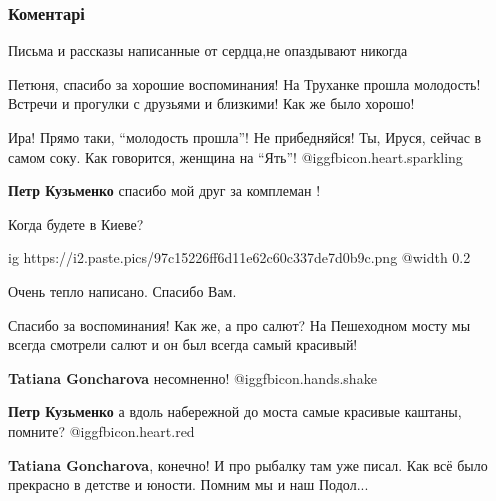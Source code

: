  
 
 
 
 
\subsubsection{Коментарі}
\label{sec:19_06_2021.fb.fb_group.story_kiev_ua.1.most_truhanov.cmt}

\begin{itemize} %
Письма и рассказы написанные от сердца,не опаздывают никогда

Петюня, спасибо за хорошие воспоминания! На Труханке прошла молодость! Встречи
и прогулки с друзьями и близкими! Как же было хорошо!

\begin{itemize} %
Ира! Прямо таки, \enquote{молодость прошла}! Не прибедняйся! Ты, Ируся, сейчас
в самом соку. Как говорится, женщина на \enquote{Ять}!  @igg{fbicon.heart.sparkling} 

\textbf{Петр Кузьменко} спасибо мой друг за комплеман !

Когда будете в Киеве?
\end{itemize} %


\ifcmt
  ig https://i2.paste.pics/97c15226ff6d11e62c60c337de7d0b9c.png
  @width 0.2
\fi

Очень тепло написано. Спасибо Вам.



Спасибо за воспоминания! Как же, а про салют? На Пешеходном мосту мы всегда
смотрели салют и он был всегда самый красивый!

\begin{itemize} %
\textbf{Tatiana Goncharova} несомненно!  @igg{fbicon.hands.shake} 

\textbf{Петр Кузьменко} а вдоль набережной до моста самые красивые каштаны, помните? @igg{fbicon.heart.red}

\textbf{Tatiana Goncharova}, конечно! И про рыбалку там уже писал. Как всё было прекрасно в детстве и юности. Помним мы и наш Подол...


\end{itemize}
\end{itemize}
